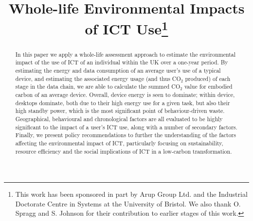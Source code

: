 \documentclass[conference]{IEEEtran}
\begin{document}

\title{Whole-life Environmental Impacts of ICT Use\thanks{This work
    has been sponsored in part by Arup Group Ltd. and the Industrial
    Doctorate Centre in Systems at the University of Bristol. We also
    thank O. Spragg and S. Johnson for their contribution to earlier
    stages of this work.}}


\author{
}





\maketitle


\begin{abstract}
In this paper we apply a whole-life assessment approach to estimate the
environmental impact of the use of ICT of an individual within the UK
over a one-year period. By estimating the energy and data consumption
of an average user's use of a typical device, and estimating
the associated energy usage (and thus CO$_2$ produced) of each stage
in the data chain, we are able to calculate the summed CO$_2$ value
for embodied carbon of an average device. 
Overall, device energy is seen to dominate; within device, desktops
dominate, both due to their high energy use for a given task, but also
their high standby power, which is the most significant point of
behaviour-driven waste. Geographical, behavioural and chronological
factors are all evaluated to be highly significant to the impact of a
user's ICT use, along with a number of secondary factors. Finally, we
present policy recommendations to further the understanding of the
factors affecting the environmental impact of ICT, particularly
focusing on sustainability, resource efficiency and the social
implications of ICT in a low-carbon transformation.
\end{abstract}
\end{document}

